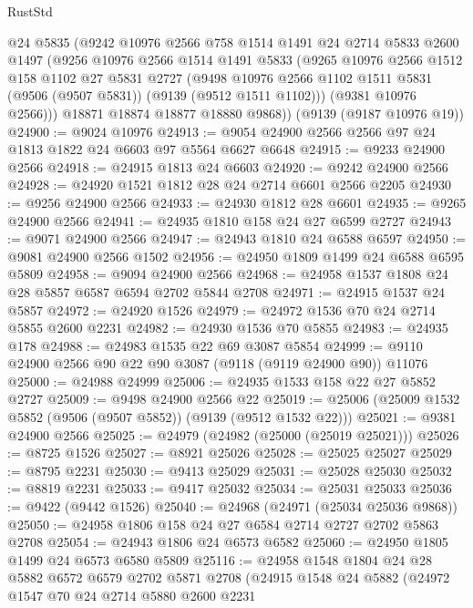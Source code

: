\begin{lexlean}{RustStd}
\begin{coremodule}
      @24
      @5835
      (@9242
        @10976
        @2566
        @758
        @1514
        @1491
        @24
        @2714
        @5833
        @2600
        @1497
        (@9256
          @10976
          @2566
          @1514
          @1491
          @5833
          (@9265
            @10976
            @2566
            @1512
            @158
            @1102
            @27
            @5831
            @2727
            (@9498 @10976 @2566 @1102 @1511 @5831 (@9506 (@9507 @5831)) (@9139 (@9512 @1511 @1102)))
            (@9381 @10976 @2566)))
        @18871
        @18874
        @18877
        @18880
        @9868))
    (@9139 (@9187 @10976 @19))
@24900 := @9024 @10976
@24913 := @9054 @24900 @2566 @2566 @97 @24 @1813 @1822 @24 @6603 @97 @5564 @6627 @6648
@24915 := @9233 @24900 @2566
@24918 := @24915 @1813 @24 @6603
@24920 := @9242 @24900 @2566
@24928 := @24920 @1521 @1812 @28 @24 @2714 @6601 @2566 @2205
@24930 := @9256 @24900 @2566
@24933 := @24930 @1812 @28 @6601
@24935 := @9265 @24900 @2566
@24941 := @24935 @1810 @158 @24 @27 @6599 @2727
@24943 := @9071 @24900 @2566
@24947 := @24943 @1810 @24 @6588 @6597
@24950 := @9081 @24900 @2566 @1502
@24956 := @24950 @1809 @1499 @24 @6588 @6595 @5809
@24958 := @9094 @24900 @2566
@24968 := @24958 @1537 @1808 @24 @28 @5857 @6587 @6594 @2702 @5844 @2708
@24971 := @24915 @1537 @24 @5857
@24972 := @24920 @1526
@24979 := @24972 @1536 @70 @24 @2714 @5855 @2600 @2231
@24982 := @24930 @1536 @70 @5855
@24983 := @24935 @178
@24988 := @24983 @1535 @22 @69 @3087 @5854
@24999 := @9110 @24900 @2566 @90 @22 @90 @3087 (@9118 (@9119 @24900 @90)) @11076
@25000 := @24988 @24999
@25006 := @24935 @1533 @158 @22 @27 @5852 @2727
@25009 := @9498 @24900 @2566 @22
@25019 := @25006 (@25009 @1532 @5852 (@9506 (@9507 @5852)) (@9139 (@9512 @1532 @22)))
@25021 := @9381 @24900 @2566
@25025 := @24979 (@24982 (@25000 (@25019 @25021)))
@25026 := @8725 @1526
@25027 := @8921 @25026
@25028 := @25025 @25027
@25029 := @8795 @2231
@25030 := @9413 @25029
@25031 := @25028 @25030
@25032 := @8819 @2231
@25033 := @9417 @25032
@25034 := @25031 @25033
@25036 := @9422 (@9442 @1526)
@25040 := @24968 (@24971 (@25034 @25036 @9868))
@25050 := @24958 @1806 @158 @24 @27 @6584 @2714 @2727 @2702 @5863 @2708
@25054 := @24943 @1806 @24 @6573 @6582
@25060 := @24950 @1805 @1499 @24 @6573 @6580 @5809
@25116 := @24958
    @1548
    @1804
    @24
    @28
    @5882
    @6572
    @6579
    @2702
    @5871
    @2708
    (@24915
      @1548
      @24
      @5882
      (@24972
        @1547
        @70
        @24
        @2714
        @5880
        @2600
        @2231

\end{coremodule}
\end{lexlean}
